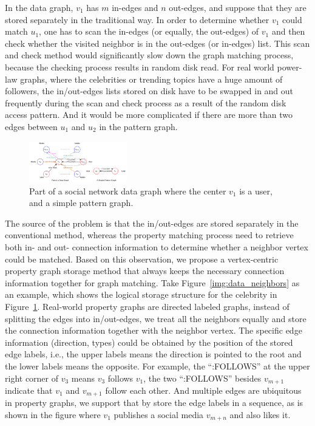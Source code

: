 In the data graph, $v_1$ has $m$ in-edges and $n$ out-edges, and suppose that they are stored separately in the traditional way.
In order to determine whether $v_1$ could match $u_1$,
one has to scan the in-edges (or equally, the out-edges) of $v_1$ and then check whether the visited neighbor is in the out-edges (or in-edges) list.
This scan and check method would significantly slow down the graph matching process,
because the checking process results in random disk read.
For real world power-law graphs, where the celebrities or trending topics have a huge amount of followers,
the in/out-edges lists stored on disk have to be swapped in and out frequently during the scan and check process as a result of the random disk access pattern.
And it would be more complicated if there are more than two edges between $u_1$ and $u_2$ in the pattern graph.
\begin{figure}[ht]
  \centering
  \includegraphics[width=0.38\textwidth]{img/celebrity_star.pdf}
  \caption{Part of a social network data graph where the center $v_1$ is a user, and a simple pattern graph.}\label{img:celebrity_star}
\end{figure}

The source of the problem is that the in/out-edges are stored separately in the conventional method,
whereas the property matching process need to retrieve both in- and out- connection information to determine whether a neighbor vertex could be matched.
Based on this observation, we propose a vertex-centric property graph storage method that always keeps the necessary connection information together for graph matching.
Take Figure~\ref{img:data_neighbors} as an example, which shows the logical storage structure for the celebrity in Figure~\ref{img:celebrity_star}.
Real-world property graphs are directed labeled graphs, instead of splitting the edges into in/out-edges,
we treat all the neighbors equally and store the connection information together with the neighbor vertex.
The specific edge information (direction, types) could be obtained by the position of the stored edge labels, i.e.,
the upper labels means the direction is pointed to the root and the lower labels means the opposite.
For example, the ``:FOLLOWS'' at the upper right corner of $v_3$ means $v_3$ follows $v_1$,
the two ``:FOLLOWS'' besides $v_{m+1}$ indicate that $v_1$ and $v_{m+1}$ follow each other.
And multiple edges are ubiquitous in property graphs, we support that by store the edge labels in a sequence,
as is shown in the figure where $v_1$ publishes a social media $v_{m+n}$ and also likes it.

